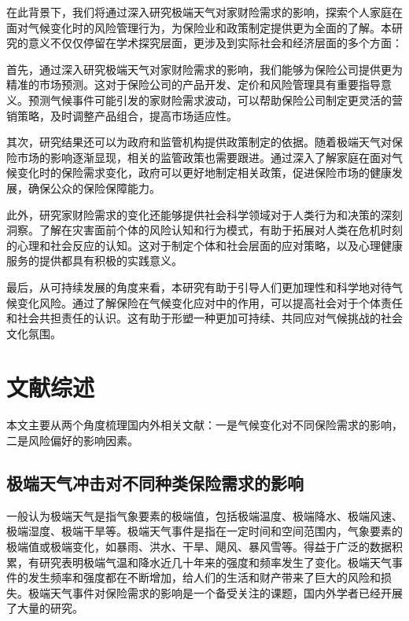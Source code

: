 在此背景下，我们将通过深入研究极端天气对家财险需求的影响，探索个人家庭在面对气候变化时的风险管理行为，为保险业和政策制定提供更为全面的了解。本研究的意义不仅仅停留在学术探究层面，更涉及到实际社会和经济层面的多个方面：

首先，通过深入研究极端天气对家财险需求的影响，我们能够为保险公司提供更为精准的市场预测。这对于保险公司的产品开发、定价和风险管理具有重要指导意义。预测气候事件可能引发的家财险需求波动，可以帮助保险公司制定更灵活的营销策略，及时调整产品组合，提高市场适应性。

其次，研究结果还可以为政府和监管机构提供政策制定的依据。随着极端天气对保险市场的影响逐渐显现，相关的监管政策也需要跟进。通过深入了解家庭在面对气候变化时的保险需求变化，政府可以更好地制定相关政策，促进保险市场的健康发展，确保公众的保险保障能力。

此外，研究家财险需求的变化还能够提供社会科学领域对于人类行为和决策的深刻洞察。了解在灾害面前个体的风险认知和行为模式，有助于拓展对人类在危机时刻的心理和社会反应的认知。这对于制定个体和社会层面的应对策略，以及心理健康服务的提供都具有积极的实践意义。

最后，从可持续发展的角度来看，本研究有助于引导人们更加理性和科学地对待气候变化风险。通过了解保险在气候变化应对中的作用，可以提高社会对于个体责任和社会共担责任的认识。这有助于形塑一种更加可持续、共同应对气候挑战的社会文化氛围。

\section{文献综述}

本文主要从两个角度梳理国内外相关文献：一是气候变化对不同保险需求的影响，二是风险偏好的影响因素。

\subsection{极端天气冲击对不同种类保险需求的影响}
一般认为极端天气是指气象要素的极端值，包括极端温度、极端降水、极端风速、极端湿度、极端干旱等\citep{傅良2022ECMWF,吴大明2021近年来全球极端天气气候事件情况及影响分析}。极端天气事件是指在一定时间和空间范围内，气象要素的极端值或极端变化，如暴雨、洪水、干旱、飓风、暴风雪等。得益于广泛的数据积累，有研究表明极端气温和降水近几十年来的强度和频率发生了变化\citep{ummenhofer2017extreme}。极端天气事件的发生频率和强度都在不断增加，给人们的生活和财产带来了巨大的风险和损失。极端天气事件对保险需求的影响是一个备受关注的课题，国内外学者已经开展了大量的研究。

